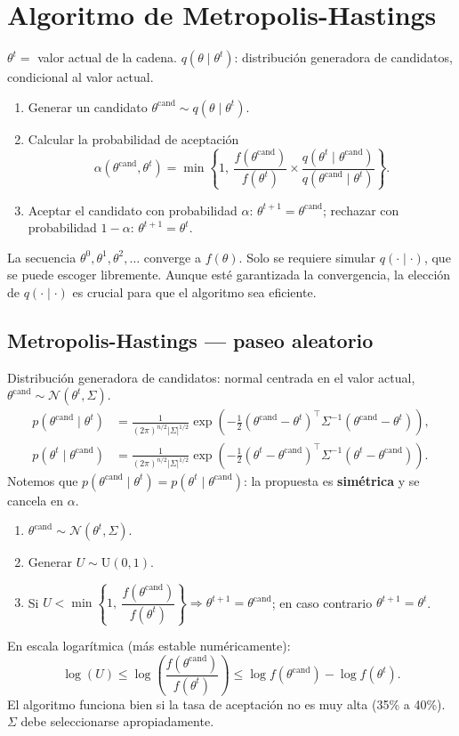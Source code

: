 \documentclass[11pt]{article}
\newcommand{\N}{\mathcal{N}}
\theoremstyle{definition}
\begin{document}
\section{Algoritmo de Metropolis-Hastings}
$\theta^t=$ valor actual de la cadena. $q(\theta\mid\theta^t)$: distribución generadora de candidatos, condicional al valor actual.
\begin{enumerate}[leftmargin=2em]
  \item Generar un candidato $\theta^{\text{cand}}\sim q(\theta\mid\theta^t)$.
  \item Calcular la probabilidad de aceptación
  \[
  \alpha(\theta^{\text{cand}},\theta^t)=\min\left\{1,\ \frac{f(\theta^{\text{cand}})}{f(\theta^t)}\times\frac{q(\theta^t\mid\theta^{\text{cand}})}{q(\theta^{\text{cand}}\mid\theta^t)}\right\}.
  \]
  \item Aceptar el candidato con probabilidad $\alpha$: $\theta^{t+1}=\theta^{\text{cand}}$; rechazar con probabilidad $1-\alpha$: $\theta^{t+1}=\theta^t$.
\end{enumerate}
La secuencia $\theta^0,\theta^1,\theta^2,\dots$ converge a $f(\theta)$. Solo se requiere simular $q(\cdot\mid\cdot)$, que se puede escoger libremente. Aunque esté garantizada la convergencia, la elección de $q(\cdot\mid\cdot)$ es crucial para que el algoritmo sea eficiente.

\subsection{Metropolis-Hastings — paseo aleatorio}
Distribución generadora de candidatos: normal centrada en el valor actual, $\theta^{\text{cand}}\sim\N(\theta^t,\Sigma)$.
\begin{align*}
p(\theta^{\text{cand}}\mid\theta^t)&=\frac{1}{(2\pi)^{n/2}|\Sigma|^{1/2}}\exp\!\left(-\tfrac12(\theta^{\text{cand}}-\theta^t)^{\top}\Sigma^{-1}(\theta^{\text{cand}}-\theta^t)\right),\\
p(\theta^t\mid\theta^{\text{cand}})&=\frac{1}{(2\pi)^{n/2}|\Sigma|^{1/2}}\exp\!\left(-\tfrac12(\theta^t-\theta^{\text{cand}})^{\top}\Sigma^{-1}(\theta^t-\theta^{\text{cand}})\right).
\end{align*}
Notemos que $p(\theta^{\text{cand}}\mid\theta^t)=p(\theta^t\mid\theta^{\text{cand}})$: la propuesta es \textbf{simétrica} y se cancela en $\alpha$.
\begin{enumerate}[leftmargin=2em]
  \item $\theta^{\text{cand}}\sim\N(\theta^t,\Sigma)$.
  \item Generar $U\sim\text{U}(0,1)$.
  \item Si $U<\min\left\{1,\ \dfrac{f(\theta^{\text{cand}})}{f(\theta^t)}\right\}\Rightarrow\theta^{t+1}=\theta^{\text{cand}}$; en caso contrario $\theta^{t+1}=\theta^t$.
\end{enumerate}
En escala logarítmica (más estable numéricamente):
\[
\log(U)\le\log\!\left(\frac{f(\theta^{\text{cand}})}{f(\theta^t)}\right)\le\log f(\theta^{\text{cand}})-\log f(\theta^t).
\]
El algoritmo funciona bien si la tasa de aceptación no es muy alta (35\% a 40\%). $\Sigma$ debe seleccionarse apropiadamente.
\end{document}
